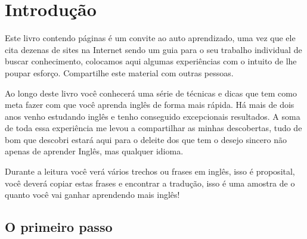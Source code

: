 
\chapter{Introdução}\label{cha:intro}


Este livro contendo \pageref{LastPage} páginas é um convite ao auto
aprendizado, uma vez que ele cita dezenas de sites na Internet sendo um guia
para o seu trabalho individual de buscar conhecimento, colocamos aqui algumas
experiências com o intuito de lhe poupar esforço.  Compartilhe este material
com outras pessoas.

Ao longo deste livro você conhecerá uma série de técnicas
e dicas que tem como meta fazer com que você aprenda inglês
de forma mais rápida. Há mais de dois anos venho estudando
inglês e tenho conseguido excepcionais resultados. A soma
de toda essa experiência me levou a compartilhar as minhas
descobertas, tudo de bom que descobri estará aqui para
o deleite dos que tem o desejo sincero não apenas de
aprender Inglês, mas qualquer idioma.

\vspace{0.3\baselineskip}
\noindent
{\footnotesize {} Durante a leitura você verá vários trechos ou frases
em inglês, isso é proposital, você deverá copiar estas frases e
encontrar a tradução, isso é uma amostra de o quanto você vai
ganhar aprendendo mais inglês!}

\section{O primeiro passo}\label{sec:mil-palavras}

